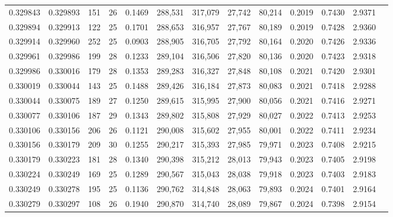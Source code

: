 \begin{tabular}{rrrrrrrrrrrrr}
0.329843 & 0.329893 &   151 &  26 &                                     0.1469 & 288,531 & 317,079 &  27,742 &  80,214 & 0.2019 & 0.7430 & 2.9371 \\
0.329894 & 0.329913 &   122 &  25 &                                     0.1701 & 288,653 & 316,957 &  27,767 &  80,189 & 0.2019 & 0.7428 & 2.9360 \\
0.329914 & 0.329960 &   252 &  25 &                                     0.0903 & 288,905 & 316,705 &  27,792 &  80,164 & 0.2020 & 0.7426 & 2.9336 \\
0.329961 & 0.329986 &   199 &  28 &                                     0.1233 & 289,104 & 316,506 &  27,820 &  80,136 & 0.2020 & 0.7423 & 2.9318 \\
0.329986 & 0.330016 &   179 &  28 &                                     0.1353 & 289,283 & 316,327 &  27,848 &  80,108 & 0.2021 & 0.7420 & 2.9301 \\
0.330019 & 0.330044 &   143 &  25 &                                     0.1488 & 289,426 & 316,184 &  27,873 &  80,083 & 0.2021 & 0.7418 & 2.9288 \\
0.330044 & 0.330075 &   189 &  27 &                                     0.1250 & 289,615 & 315,995 &  27,900 &  80,056 & 0.2021 & 0.7416 & 2.9271 \\
0.330077 & 0.330106 &   187 &  29 &                                     0.1343 & 289,802 & 315,808 &  27,929 &  80,027 & 0.2022 & 0.7413 & 2.9253 \\
0.330106 & 0.330156 &   206 &  26 &                                     0.1121 & 290,008 & 315,602 &  27,955 &  80,001 & 0.2022 & 0.7411 & 2.9234 \\
0.330156 & 0.330179 &   209 &  30 &                                     0.1255 & 290,217 & 315,393 &  27,985 &  79,971 & 0.2023 & 0.7408 & 2.9215 \\
0.330179 & 0.330223 &   181 &  28 &                                     0.1340 & 290,398 & 315,212 &  28,013 &  79,943 & 0.2023 & 0.7405 & 2.9198 \\
0.330224 & 0.330249 &   169 &  25 &                                     0.1289 & 290,567 & 315,043 &  28,038 &  79,918 & 0.2023 & 0.7403 & 2.9183 \\
0.330249 & 0.330278 &   195 &  25 &                                     0.1136 & 290,762 & 314,848 &  28,063 &  79,893 & 0.2024 & 0.7401 & 2.9164 \\
0.330279 & 0.330297 &   108 &  26 &                                     0.1940 & 290,870 & 314,740 &  28,089 &  79,867 & 0.2024 & 0.7398 & 2.9154 \\

\end{tabular}
